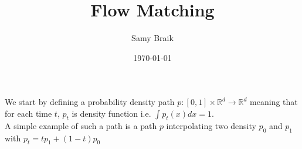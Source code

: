 \documentclass[a4paper,12pt]{article}
\title{Flow Matching}
\author{Samy Braik}
\date{\today}
\begin{document}
\maketitle

We start by defining a probability density path \(p:[0,1]\times\mathbb{R}^d\rightarrow\mathbb{R}^d\) meaning that for each time \(t\), \(p_t\) is density function i.e. \(\int p_t(x)dx=1\).\\
A simple example of such a path is a path \(p\) interpolating two density \(p_0\) and \(p_1\) with \(p_t=tp_1+(1-t)p_0\)

\end{document}
